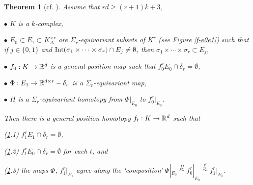 \documentclass[12pt]{article}
\def\diag{\delta}
\def\Int{\mathop{\fam0 Int}}
\def\rel{\mathop{\fam0 rel}}
\def\Cl{\mathop{\fam0 Cl}}
\theoremstyle{plain}
\newtheorem{Theorem}{Theorem}[section]
\theoremstyle{definition}
\begin{document}
\begin{Theorem}[cf. {\cite[Disjunction Theorem 3.1]{Sk02}}]\label{t:mmwi}
Assume that $rd\ge(r+1)k+3$,

$\bullet$ $K$ is a $k$-complex,


$\bullet$
$E_0\subset E_1 \subset K^{\times r}_{\Delta}$ are $\Sigma_r$-equivariant subsets of $K^r$ (see Figure \ref{f-e0e1}) such that if $j\in\{0,1\}$ and
\linebreak
$\Int(\sigma_1\times\cdots\times\sigma_r)\cap E_j\ne\emptyset$, then $\sigma_1\times\cdots\times\sigma_r\subset E_j$,

$\bullet$ $f_0:K\to {\mathbb R}^d$ is a general position map such that
$f_0^rE_0\cap\diag_r=\emptyset$,

$\bullet$ $\Phi:E_1\to \R^{d\times r}-\diag_r$ is a $\Sigma_r$-equivariant map,

$\bullet$ $H$ is a $\Sigma_r$-equivariant homotopy from $\Phi|_{E_0}$ to $f_0^r|_{E_0}$.


Then there is a general position homotopy $f_t:K\to{\mathbb R}^d$
such that


(\ref{t:mmwi}.1) $f_1^rE_1\cap\diag_r=\emptyset$,

(\ref{t:mmwi}.2) $f_t^rE_0\cap\diag_r=\emptyset$ for each $t$, and

(\ref{t:mmwi}.3) the maps $\Phi$, $f_1^r|_{E_1}$ agree along
the `composition' $\Phi|_{E_0}\overset{H}\simeq f_0^r|_{E_0}\overset{f_t^r}\simeq f_1^r|_{E_0}$.
 \end{Theorem}
\end{document}
